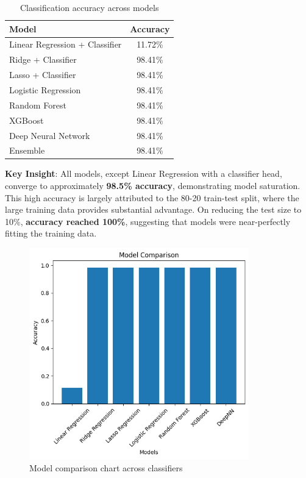 \documentclass{article}
\begin{document}
\begin{table}[H]
\centering
\begin{tabular}{lc}
\toprule
\textbf{Model} & \textbf{Accuracy} \\
\midrule
Linear Regression + Classifier & 11.72\% \\
Ridge + Classifier & 98.41\% \\
Lasso + Classifier & 98.41\% \\
Logistic Regression & 98.41\% \\
Random Forest & 98.41\% \\
XGBoost & 98.41\% \\
Deep Neural Network & 98.41\% \\
Ensemble & 98.41\% \\
\bottomrule
\end{tabular}
\caption{Classification accuracy across models}
\end{table}

\textbf{Key Insight}: All models, except Linear Regression with a classifier head, converge to approximately \textbf{98.5\% accuracy}, demonstrating model saturation. This high accuracy is largely attributed to the 80-20 train-test split, where the large training data provides substantial advantage. On reducing the test size to 10\%, \textbf{accuracy reached 100\%}, suggesting that models were near-perfectly fitting the training data.

\begin{figure}[H]
\centering
\includegraphics[width=0.85\textwidth]{model_comparison.png}
\caption{Model comparison chart across classifiers}
\end{figure}
\end{document}

